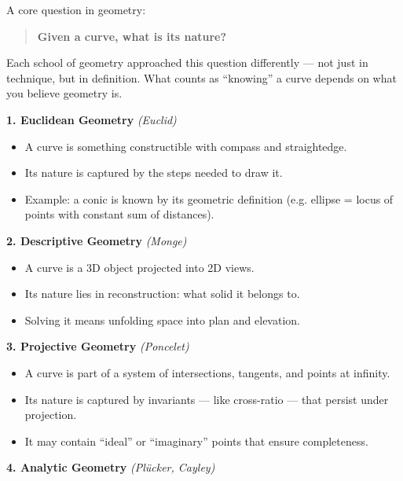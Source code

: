 \documentclass[9pt]{article}
\begin{document}
A core question in geometry:

\begin{quote}
\textbf{Given a curve, what is its nature?}
\end{quote}

\noindent
Each school of geometry approached this question differently — not just in technique, but in definition.  
What counts as “knowing” a curve depends on what you believe geometry is.

\bigskip

\textbf{1. Euclidean Geometry} \hfill \textit{(Euclid)}

\begin{itemize}
  \item A curve is something constructible with compass and straightedge.
  \item Its nature is captured by the steps needed to draw it.
  \item Example: a conic is known by its geometric definition (e.g. ellipse = locus of points with constant sum of distances).
\end{itemize}

\bigskip

\textbf{2. Descriptive Geometry} \hfill \textit{(Monge)}

\begin{itemize}
  \item A curve is a 3D object projected into 2D views.
  \item Its nature lies in reconstruction: what solid it belongs to.
  \item Solving it means unfolding space into plan and elevation.
\end{itemize}

\bigskip

\textbf{3. Projective Geometry} \hfill \textit{(Poncelet)}

\begin{itemize}
  \item A curve is part of a system of intersections, tangents, and points at infinity.
  \item Its nature is captured by invariants — like cross-ratio — that persist under projection.
  \item It may contain “ideal” or “imaginary” points that ensure completeness.
\end{itemize}

\bigskip

\textbf{4. Analytic Geometry} \hfill \textit{(Plücker, Cayley)}
\end{document}
